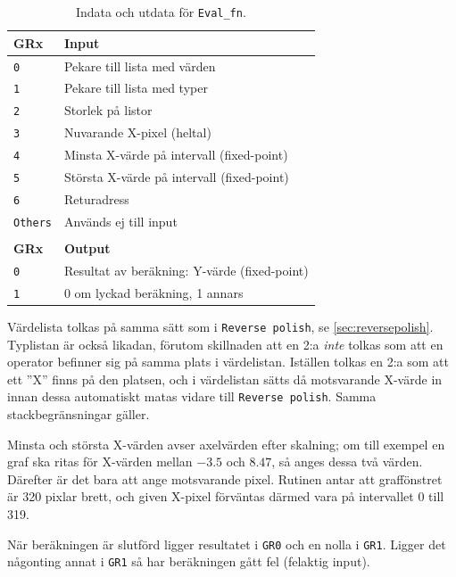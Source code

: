 \documentclass[]{article}
\begin{document}
\begin{table}[H]
\centering
\begin{tabular}{ll}
	\textbf{GRx}    & \textbf{Input}               \\ \hline
	\texttt{0}      & Pekare till lista med värden \\
	\texttt{1}      & Pekare till lista med typer  \\
	\texttt{2}      & Storlek på listor            \\
	\texttt{3}      & Nuvarande X-pixel (heltal)   \\
	\texttt{4}      & Minsta X-värde på intervall (fixed-point) \\
	\texttt{5}      & Största X-värde på intervall (fixed-point) \\
        \texttt{6}      & Returadress                  \\
        \texttt{Others} & Används ej till input        \\
                        &                              \\
	\textbf{GRx}    & \textbf{Output}              \\ \hline
	\texttt{0}      & Resultat av beräkning: Y-värde (fixed-point) \\
	\texttt{1}      & 0 om lyckad beräkning, 1 annars
\end{tabular}
\caption{Indata och utdata för \texttt{Eval\_fn}.}
\end{table}

\noindent
Värdelista tolkas på samma sätt som i \texttt{Reverse polish}, se \ref{sec:reversepolish}. Typlistan är också likadan, förutom skillnaden att en 2:a \textit{inte} tolkas som att en operator befinner sig på samma plats i värdelistan. Iställen tolkas en 2:a som att ett ''X'' finns på den platsen, och i värdelistan sätts då motsvarande X-värde in innan dessa automatiskt matas vidare till \texttt{Reverse polish}. Samma stackbegränsningar gäller.

Minsta och största X-värden avser axelvärden efter skalning; om till exempel en graf ska ritas för X-värden mellan $-3.5$ och $8.47$, så anges dessa två värden. Därefter är det bara att ange motsvarande pixel. Rutinen antar att graffönstret är 320 pixlar brett, och given X-pixel förväntas därmed vara på intervallet 0 till 319.

När beräkningen är slutförd ligger resultatet i \texttt{GR0} och en nolla i \texttt{GR1}. Ligger det någonting annat i \texttt{GR1} så har beräkningen gått fel (felaktig input).
\end{document}
